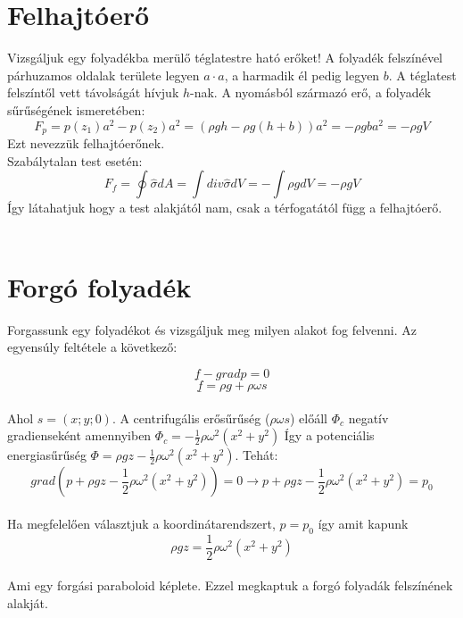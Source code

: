 \documentclass[a4paper]{article}
\begin{document}
\section{Felhajtóerő}
Vizsgáljuk egy folyadékba merülő téglatestre ható erőket! A folyadék felszínével párhuzamos oldalak területe legyen $a\cdot a$, a harmadik él pedig legyen $b$. A téglatest felszíntől vett távolságát hívjuk $h$-nak.
A nyomásból származó erő, a folyadék sűrűségének ismeretében:
\begin{equation}
F_{p}=p(z_{1})a^{2}-p(z_2)a^2=(\rho gh-\rho g(h+b))a^2=-\rho gba^2=-\rho gV
\end{equation}
Ezt nevezzük felhajtóerőnek.
\\
Szabálytalan test esetén:
\begin{equation}
F_f=\oint\hat{\sigma}dA=\int div\hat{\sigma}dV=-\int\rho gdV=-\rho gV
\end{equation}
Így látahatjuk hogy a test alakjától nam, csak a térfogatától függ a felhajtóerő.
\\
\\
\section{Forgó folyadék}
Forgassunk egy folyadékot és vizsgáljuk meg milyen alakot fog felvenni.
Az egyensúly feltétele a következő:

\begin{equation}
\underline{f}-gradp=0
\end{equation}
\begin{equation}
\underline{f}=\rho g+\rho\omega s
\end{equation}
\\
Ahol $s=(x;y;0)$. A centrifugális erősűrűség ($\rho\omega s$) előáll $\Phi_c$ negatív gradienseként amennyiben $\Phi_c=-\frac{1}{2}\rho\omega^2(x^2+y^2)$ Így a potenciális energiasűrűség $\Phi=\rho gz-\frac{1}{2}\rho\omega^2(x^2+y^2)$. Tehát:
\begin{equation}
grad(p+\rho gz-\frac{1}{2}\rho\omega^2(x^2+y^2))=0 \rightarrow p+\rho gz-\frac{1}{2}\rho\omega^2(x^2+y^2)=p_0
\end{equation}
\\
Ha megfelelően választjuk a koordinátarendszert, $p=p_0$ így amit kapunk
\begin{equation}
\rho gz=\frac{1}{2}\rho\omega^2(x^2+y^2)
\end{equation}
\\
Ami egy forgási paraboloid képlete. Ezzel megkaptuk a forgó folyadák felszínének alakját.
\\
\end{document}
